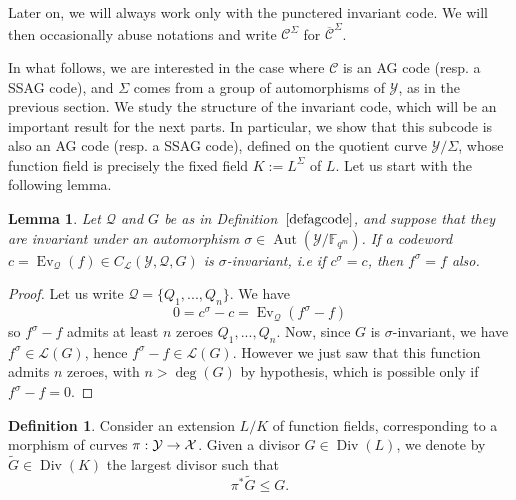 \documentclass[10pt]{article}
\newtheorem{lem1}[thm]{Lemma}
\theoremstyle{definition}
\theoremstyle{definition}
\theoremstyle{definition}
\newtheorem{def1}[thm]{Definition}
\newcommand{\Fqm}{\mathbb{F}_{q^m}}
\newcommand{\Y}{\mathcal{Y}}
\newcommand{\QR}{\mathcal{Q}}
\newcommand{\Div}{\operatorname{Div}}
\newcommand{\Aut}{\operatorname{Aut}}
\newcommand{\calL}{\mathcal{L}}
\begin{document}
Later on, we will always work only with the punctered invariant code. We will then occasionally abuse notations and write $\mathcal{C}^{\Sigma}$ for $\overline{\mathcal{C}}^{\Sigma}$.

In what follows, we are interested in the case where $\mathcal{C}$ is an AG code (resp. a SSAG code), and $\Sigma$ comes from a group of automorphisms of $\Y$, as in the previous section.
We study the structure of the invariant code, which will be an important result for the next parts. In particular, we show that this subcode is also an AG code (resp. a SSAG code), defined on the quotient curve $\Y/\Sigma$, whose function field is precisely the fixed field $K:=L^{\Sigma}$ of $L$. Let us start with the following lemma.

\begin{lem1} \label{inv}
Let $\QR$ and $G$ be as in Definition~$\ref{defagcode}$, and suppose that they are invariant under an automorphism $\sigma \in \Aut(\Y/\Fqm)$. If a codeword $c = \operatorname{Ev}_{\QR}(f) \in C_{\calL}(\Y,\QR,G)$ is $\sigma$-invariant, \emph{i.e} if $c^\sigma = c$, then $f^\sigma = f$ also. 
\end{lem1}

\begin{proof}
Let us write $\QR = \{Q_1,...,Q_n\}$.
We have $$0=c^\sigma-c=\operatorname{Ev}_{\QR}(f^\sigma-f)$$
so $f^\sigma-f$ admits at least $n$ zeroes $Q_1,...,Q_n$.
Now, since  $G$ is $\sigma$-invariant, we have $f^\sigma\in\calL(G)$,
hence $f^\sigma-f\in\calL(G)$.
However we just saw that this function admits $n$ zeroes, with $n>\deg(G)$ by hypothesis,
which is possible only if $f^\sigma-f=0$.
\end{proof}

\begin{def1} \label{pousseavant}
Consider an extension $L/K$ of function fields, corresponding to a morphism of curves $\pi:\cal{Y}\rightarrow\cal{X}$.
Given a divisor $G \in \Div(L)$, we denote by $\tilde{G} \in \Div(K)$ the largest divisor such that
\[\pi^*\tilde{G} \leq G.\]
\end{def1} 
 
\end{document}
